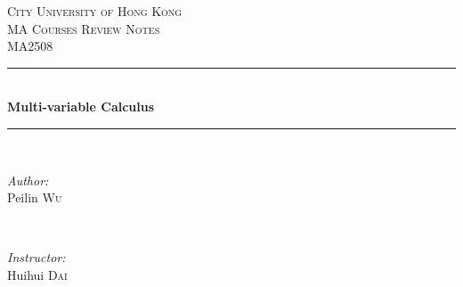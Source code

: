 \begin{titlepage}
\newcommand{\HRule}{\rule{\linewidth}{0.5mm}} %

\center %


\textsc{\LARGE City University of Hong Kong}\\[1.5cm] %
\textsc{\Large MA Courses Review Notes}\\[0.5cm] 		%
\textsc{\large {MA2508}}\\[0.5cm] 						%


\HRule \\[0.4cm]
{ \huge \sffamily \bfseries  Multi-variable Calculus }\\[0.4cm] %
\HRule \\[1.5cm]


\begin{minipage}{0.4\textwidth}
\begin{flushleft} \large
\emph{Author:}\\
Peilin \textsc{Wu}
\end{flushleft}
\end{minipage}
~
\begin{minipage}{0.4\textwidth}
\begin{flushright} \large
\emph{Instructor:} \\
Huihui \textsc{Dai} %
\end{flushright}
\end{minipage}\\[2cm]



\end{titlepage}

